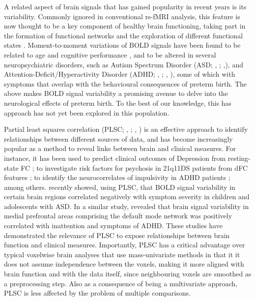    A related aspect of brain signals that has gained popularity in recent years is its variability. Commonly ignored in conventional rs-fMRI analysis, this feature is now thought to be a key component of healthy brain functioning, taking part in the formation of functional networks \citep{Fuchs2007} and the exploration of different functional states \citep{Ghosh2008, McIntosh2010}. Moment-to-moment variations of BOLD signals have been found to be related to age and cognitive performance \citep{Garrett2013}, and to be altered in several neuropsychiatric disorders, such as Autism Spectrum Disorder (ASD; \citeauthor{DiMartino2014}, \citeyear{DiMartino2014}; \citeauthor{Easson2019},\citeyear{Easson2019}), and  Attention-Deficit/Hyperactivity Disorder (ADHD; \citeauthor{Zang2007}, \citeyear{Zang2007}; \citeauthor{Nomi2018}, \citeyear{Nomi2018}), some of which with symptoms that overlap with the behavioural consequences of preterm birth. The above makes BOLD signal variability a promising avenue to delve into the neurological effects of preterm birth. To the best of our knowledge, this has approach has not yet been explored in this population.

      Partial least squares correlation (PLSC; \citeauthor{McIntosh2004}, \citeyear{McIntosh2004}; \citeauthor{Krishnan2011}, \citeyear{Krishnan2011})  is an effective approach to identify relationships between different sources of data, and has become increasingly popular as a method to reveal links between brain and clinical measures. For instance, it has been used to predict clinical outcomes of Depression from resting-state FC \citep{Yoshida2017}; to investigate risk factors for psychosis in 21q11DS patients from dFC features \citep{Zoller2019}; to identify the neurocorrelates of impulsivity in ADHD patients \citep{Barker2019}; among others. \cite{Easson2019} recently showed, using PLSC, that BOLD signal variability in certain brain regions correlated negatively with symptom severity in children and adolescents with ASD. In a similar study, \citep{Nomi2018} revealed that brain signal variability in medial prefrontal areas comprising the default mode network was positively correlated with inattention and symptoms of ADHD. These studies have demonstrated the relevance of PLSC to expose relationships between brain function and clinical measures. Importantly, PLSC has a critical advantage over typical voxelwise brain analyses that use mass-univariate methods in that it it does not assume independence between the voxels, making it more aligned with brain function and with the data itself, since neighbouring voxels are smoothed as a preprocessing step. Also as a consequence of being a multivariate approach, PLSC is less affected by the problem of multiple comparisons. 
      
